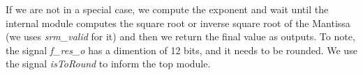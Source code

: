 If we are not in a special case, we compute the exponent and wait until the internal module computes the square root or inverse square root of the Mantissa (we uses  \emph{srm\_valid} for it) and then we return the final value as outputs. To note, the signal \emph{f\_res\_o} has a dimention of 12 bits, and it needs to be rounded. We use the signal \emph{isToRound} to inform the top module. \\

\clearpage
